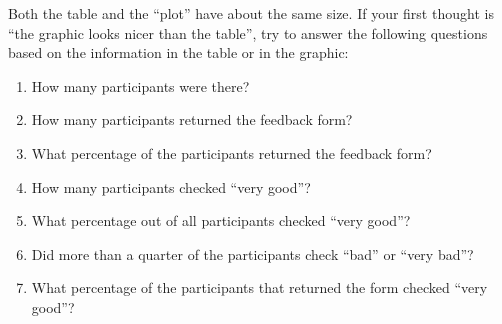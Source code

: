 \bigskip
\par
{}
\bigskip

Both the table and the ``plot'' have about the same size. If your first thought
is ``the graphic looks nicer than the table'', try to answer the following
questions based on the information in the table or in the graphic:
%
\begin{enumerate}
    \item How many participants were there?
    \item How many participants returned the feedback form?
    \item What percentage of the participants returned the feedback form?
    \item How many participants checked ``very good''?
    \item What percentage out of all participants checked ``very good''?
    \item Did more than a quarter of the participants check ``bad'' or ``very
        bad''?
    \item What percentage of the participants that returned the form checked
        ``very good''?
\end{enumerate}

